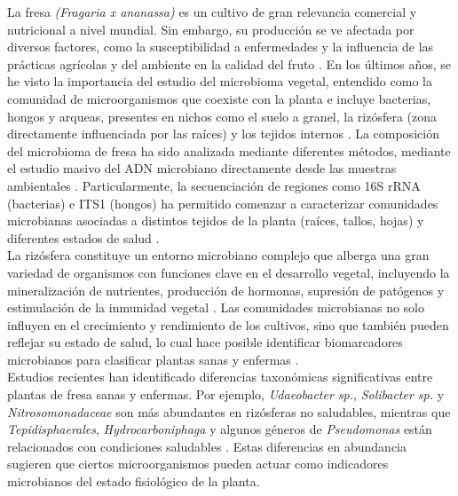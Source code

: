 La fresa \textit{(Fragaria x ananassa)} es un cultivo de gran relevancia 
comercial y nutricional a nivel mundial. Sin embargo, su producción se ve afectada 
por diversos factores, como la susceptibilidad a enfermedades y la influencia de las 
prácticas agrícolas y del ambiente en la calidad del fruto \citep{yang2020comparison, nam2023multidisciplinary, yang2023fusarium}. 
En los últimos años, se he visto la importancia del estudio del microbioma vegetal, 
entendido como la comunidad de microorganismos que coexiste con la planta e incluye bacterias, 
hongos y arqueas, presentes en nichos como el suelo a granel, la rizósfera 
(zona directamente influenciada por las raíces) 
y los tejidos internos \citep{compant2019review, siegieda2024ecological}. 
La composición del microbioma de fresa ha sido analizada mediante 
diferentes métodos, mediante el estudio masivo del ADN microbiano directamente desde 
las muestras ambientales \citep{bolyen2019reproducible, bokulich2018optimizing, hall201816s}. Particularmente, 
la secuenciación de regiones como 16S rRNA (bacterias) e ITS1 (hongos) 
ha permitido comenzar a caracterizar comunidades microbianas asociadas a distintos tejidos 
de la planta (raíces, tallos, hojas) y diferentes estados de salud \citep{yang2020comparison, zhang2023rhizosphere, siegieda2024ecological}. \\

La rizósfera constituye un entorno microbiano complejo que alberga una gran variedad 
de organismos con funciones clave en el desarrollo vegetal, incluyendo la mineralización 
de nutrientes, producción de hormonas, supresión de patógenos y estimulación de la 
inmunidad vegetal \citep{berendsen2012rhizosphere, trivedi2020plant}. 
Las comunidades microbianas no solo influyen en el crecimiento y 
rendimiento de los cultivos, sino que también pueden reflejar su estado de salud, 
lo cual hace posible identificar biomarcadores microbianos para clasificar
 plantas sanas y enfermas \citep{yang2020comparison,nam2023multidisciplinary}.  \\


Estudios recientes han identificado diferencias taxonómicas significativas
entre plantas de fresa sanas y enfermas. Por ejemplo, \textit{Udaeobacter sp.},
\textit{Solibacter sp.} y \textit{Nitrosomonadaceae} son más abundantes en rizósferas
no saludables, mientras que \textit{Tepidisphaerales}, \textit{Hydrocarboniphaga} y algunos
 géneros de \textit{Pseudomonas} están relacionados con condiciones
 saludables \citep{nam2023multidisciplinary,siegieda2024ecological}.
 Estas diferencias en abundancia sugieren que ciertos microorganismos pueden actuar 
 como indicadores microbianos del estado fisiológico de la planta. \\

